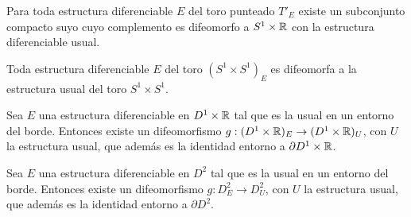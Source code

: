 \begin{hecho}
	Para toda estructura diferenciable $E$ del toro punteado $T'_E$ existe un subconjunto compacto suyo cuyo complemento es difeomorfo a $S^1 \times \mathbb{R}$ con la estructura diferenciable usual.
\end{hecho}

\begin{hecho}
	Toda estructura diferenciable $E$ del toro $(S^1 \times S^1)_E$ es difeomorfa a la estructura usual del toro $S^1 \times S^1$.
\end{hecho}

\begin{hecho}
	Sea $E$ una estructura diferenciable en $D^1 \times \mathbb{R}$ tal que es la usual en un entorno del borde. Entonces existe un difeomorfismo $g:(D^1 \times \mathbb{R})_E \rightarrow (D^1 \times \mathbb{R})_U$, con $U$ la estructura usual, que además es la identidad entorno a $\partial D^1 \times \mathbb{R}$.
\end{hecho}

\begin{hecho}
	Sea $E$ una estructura diferenciable en $D^2$ tal que es la usual en un entorno del borde. Entonces existe un difeomorfismo $g:D^2_E \rightarrow D^2_U$, con $U$ la estructura usual, que además es la identidad entorno a $\partial D^2$.
\end{hecho}



\endinput
